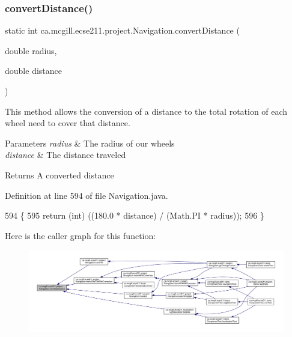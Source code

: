 \subsubsection{\texorpdfstring{convert\+Distance()}{convertDistance()}}
{\footnotesize\ttfamily static int ca.\+mcgill.\+ecse211.\+project.\+Navigation.\+convert\+Distance (\begin{DoxyParamCaption}\item[{double}]{radius,  }\item[{double}]{distance }\end{DoxyParamCaption})\hspace{0.3cm}{\ttfamily [static]}}

This method allows the conversion of a distance to the total rotation of each wheel need to cover that distance.


\begin{DoxyParams}{Parameters}
{\em radius} & The radius of our wheels \\
\hline
{\em distance} & The distance traveled \\
\hline
\end{DoxyParams}
\begin{DoxyReturn}{Returns}
A converted distance 
\end{DoxyReturn}


Definition at line 594 of file Navigation.\+java.


\begin{DoxyCode}
594                                                                     \{
595     \textcolor{keywordflow}{return} (\textcolor{keywordtype}{int}) ((180.0 * distance) / (Math.PI * radius));
596   \}
\end{DoxyCode}
Here is the caller graph for this function\+:
\nopagebreak
\begin{figure}[H]
\begin{center}
\leavevmode
\includegraphics[width=350pt]{classca_1_1mcgill_1_1ecse211_1_1project_1_1_navigation_ac9e260bcd619ffa4820d7d0de7ea1c12_icgraph}
\end{center}
\end{figure}
\mbox{\label{classca_1_1mcgill_1_1ecse211_1_1project_1_1_navigation_a7c66610c5b7496ddb35d342ab2cd3f08}} 
